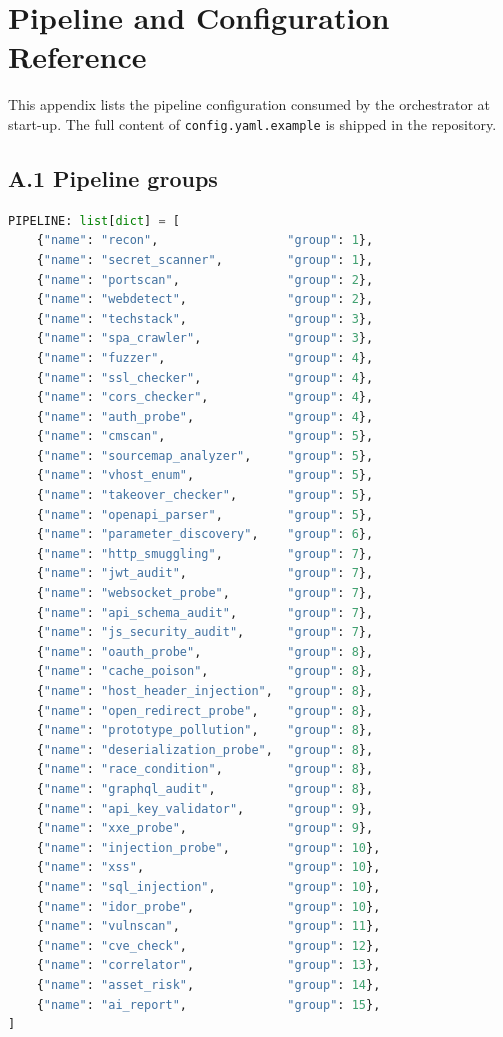 
\chapter{Pipeline and Configuration Reference}

This appendix lists the pipeline configuration consumed by the orchestrator at start-up. The full content of \texttt{config.yaml.example} is shipped in the repository.

\section*{A.1 Pipeline groups}

\begin{lstlisting}[language=Python,basicstyle=\ttfamily\footnotesize,caption={Pipeline definition consumed by \texttt{main.py}.}]
PIPELINE: list[dict] = [
    {"name": "recon",                  "group": 1},
    {"name": "secret_scanner",         "group": 1},
    {"name": "portscan",               "group": 2},
    {"name": "webdetect",              "group": 2},
    {"name": "techstack",              "group": 3},
    {"name": "spa_crawler",            "group": 3},
    {"name": "fuzzer",                 "group": 4},
    {"name": "ssl_checker",            "group": 4},
    {"name": "cors_checker",           "group": 4},
    {"name": "auth_probe",             "group": 4},
    {"name": "cmscan",                 "group": 5},
    {"name": "sourcemap_analyzer",     "group": 5},
    {"name": "vhost_enum",             "group": 5},
    {"name": "takeover_checker",       "group": 5},
    {"name": "openapi_parser",         "group": 5},
    {"name": "parameter_discovery",    "group": 6},
    {"name": "http_smuggling",         "group": 7},
    {"name": "jwt_audit",              "group": 7},
    {"name": "websocket_probe",        "group": 7},
    {"name": "api_schema_audit",       "group": 7},
    {"name": "js_security_audit",      "group": 7},
    {"name": "oauth_probe",            "group": 8},
    {"name": "cache_poison",           "group": 8},
    {"name": "host_header_injection",  "group": 8},
    {"name": "open_redirect_probe",    "group": 8},
    {"name": "prototype_pollution",    "group": 8},
    {"name": "deserialization_probe",  "group": 8},
    {"name": "race_condition",         "group": 8},
    {"name": "graphql_audit",          "group": 8},
    {"name": "api_key_validator",      "group": 9},
    {"name": "xxe_probe",              "group": 9},
    {"name": "injection_probe",        "group": 10},
    {"name": "xss",                    "group": 10},
    {"name": "sql_injection",          "group": 10},
    {"name": "idor_probe",             "group": 10},
    {"name": "vulnscan",               "group": 11},
    {"name": "cve_check",              "group": 12},
    {"name": "correlator",             "group": 13},
    {"name": "asset_risk",             "group": 14},
    {"name": "ai_report",              "group": 15},
]
\end{lstlisting}

